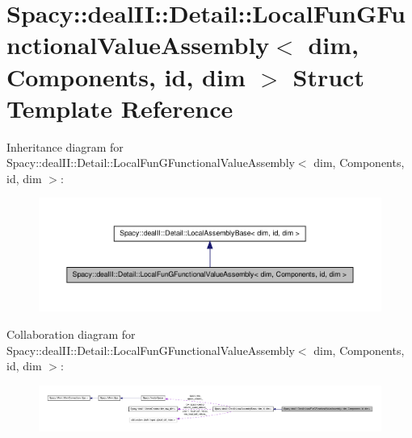 \hypertarget{structSpacy_1_1dealII_1_1Detail_1_1LocalFunGFunctionalValueAssembly_3_01dim_00_01Components_00_01id_00_01dim_01_4}{\section{\-Spacy\-:\-:deal\-I\-I\-:\-:\-Detail\-:\-:\-Local\-Fun\-G\-Functional\-Value\-Assembly$<$ dim, \-Components, id, dim $>$ \-Struct \-Template \-Reference}
\label{structSpacy_1_1dealII_1_1Detail_1_1LocalFunGFunctionalValueAssembly_3_01dim_00_01Components_00_01id_00_01dim_01_4}
}


\-Inheritance diagram for \-Spacy\-:\-:deal\-I\-I\-:\-:\-Detail\-:\-:\-Local\-Fun\-G\-Functional\-Value\-Assembly$<$ dim, \-Components, id, dim $>$\-:
\nopagebreak
\begin{figure}[H]
\begin{center}
\leavevmode
\includegraphics[width=350pt]{structSpacy_1_1dealII_1_1Detail_1_1LocalFunGFunctionalValueAssembly_3_01dim_00_01Components_00_0cd4181123df6a27e710044ace2ba7403}
\end{center}
\end{figure}


\-Collaboration diagram for \-Spacy\-:\-:deal\-I\-I\-:\-:\-Detail\-:\-:\-Local\-Fun\-G\-Functional\-Value\-Assembly$<$ dim, \-Components, id, dim $>$\-:
\nopagebreak
\begin{figure}[H]
\begin{center}
\leavevmode
\includegraphics[width=350pt]{structSpacy_1_1dealII_1_1Detail_1_1LocalFunGFunctionalValueAssembly_3_01dim_00_01Components_00_01id_00_01dim_01_4__coll__graph}
\end{center}
\end{figure}
